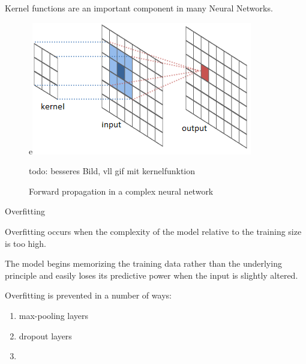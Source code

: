 \documentclass[12pt]{beamer}
\begin{document}
\begin{frame}
Kernel functions are an important component in many Neural Networks.
 \begin{figure}
\centering
e\includegraphics[width = 0.4\linewidth]{images/kernelfunction.png}
\caption{Forward propagation in a complex neural network}
todo: besseres Bild, vll gif mit kernelfunktion



\label{fig:propagation}
\end{figure}


\end{frame}


\begin{frame} {Overfitting}

Overfitting occurs when the complexity of the model relative to the training size is too high.


The model begins memorizing the training data rather  than the underlying principle and easily loses its predictive power when the input is slightly altered.

Overfitting is prevented in a number of ways:

\begin{enumerate}

\item max-pooling layers
\item dropout layers
\item

\end{enumerate}

\end{frame}
\end{document}
